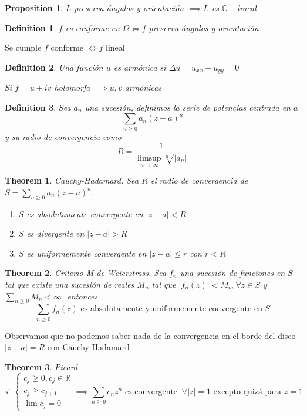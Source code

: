\documentclass{myclass} \usepackage{verbatim}
\newtheorem*{definition}{Definition}
\newtheorem*{theorem}{Theorem}
\newtheorem*{proposition}{Proposition}
\begin{document}
\begin{proposition}
$L$ preserva ángulos y orientación $\implies L $ es $\mathbb{C}-$lineal
\end{proposition}

\begin{definition}
$f$ es conforme en $\Omega \iff f$ preserva ángulos y orientación
\end{definition}

Se cumple $f$ conforme  $\iff f$ lineal

\begin{definition}
Una función $u$ es armónica si $\Delta u = u_{x x} + u_{yy} = 0$ 

Si $f = u + iv$ holomorfa  $\implies u, v$ armónicas
\end{definition}

\begin{definition}
Sea $a_n$ una sucesión, definimos la serie de potencias centrada en $a$
\[
\sum_{n\ge 0} a_n(z-a)^n
\] 
y su radio de convergencia como
\[
R = \frac{1}{\limsup_{n\to \infty} \sqrt[n]{|a_n|} }
\] 
\end{definition}

\begin{theorem}
Cauchy-Hadamard. Sea $R$ el radio de convergencia de  $S = \sum_{n\ge 0} a_n (z-a)^n$.
\begin{enumerate}[topsep=0pt, itemsep=0pt]
  \item $S$ es absolutamente convergente en  $|z-a|<R$ 
  \item $S$ es divergente en  $|z-a|>R$ 
  \item $S$ es uniformemente convergente en $|z-a|\le r$ con $r<R$
\end{enumerate}
\end{theorem}

\begin{theorem}
Criterio M de Weierstrass. Sea $f_n$ una sucesión de funciones en $S$ tal que existe una sucesión de reales  $M_n$ tal que  $|f_n(z)|<M_m \ \forall z\in S$  y $\sum_{n\ge 0} M_n<\infty$, entonces
\[
\sum_{n\ge 0} f_n(z) \text{ es absolutamente y uniformemente convergente en } S
\] 
\end{theorem}

Observamos que no podemos saber nada de la convergencia en el borde del disco $|z-a|=R$ con Cauchy-Hadamard

\begin{theorem}
Picard. 
\[
\text{si } \begin{cases}
  c_j\ge 0, c_j\in \mathbb{R} \\
  c_j\ge c_{j+1} \\
  \lim c_j = 0
\end{cases}
\implies \sum_{n\ge 0} c_nz^n \text{ es convergente } \ \forall |z|=1 \text{ excepto quizá para } z=1
\] 
\end{theorem}
\end{document}
